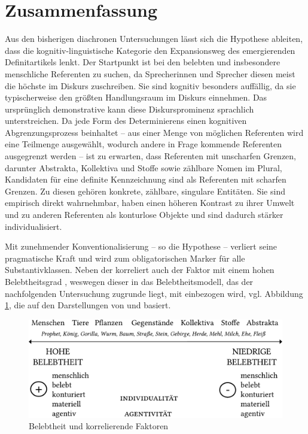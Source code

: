 \section{Zusammenfassung} \label{sec:bel-zusammenfassung}

Aus den bisherigen diachronen Untersuchungen lässt sich die Hypothese ableiten, dass die kognitiv-linguistische Kategorie  den Expansionsweg  des emergierenden Definitartikels  lenkt. Der Startpunkt ist bei den belebten  und insbesondere menschliche Referenten zu suchen, da Sprecherinnen und Sprecher diesen meist die höchste  im Diskurs zuschreiben.
Sie sind kognitiv besonders auffällig, da sie typischerweise den größten Handlungsraum im Diskurs einnehmen. Das ursprünglich demonstrative   kann diese Diskursprominenz sprachlich unterstreichen. Da jede Form des Determinierens einen kognitiven Abgrenzungsprozess beinhaltet -- aus einer Menge von möglichen Referenten wird eine Teilmenge ausgewählt, wodurch andere in Frage kommende Referenten ausgegrenzt werden -- ist zu erwarten, dass Referenten mit unscharfen Grenzen, darunter  Abstrakta, Kollektiva und Stoffe  sowie zählbare Nomen  im Plural,  Kandidaten für eine definite Kennzeichnung sind als Referenten mit scharfen Grenzen. Zu diesen gehören  konkrete, zählbare,  singulare Entitäten. Sie sind empirisch direkt wahrnehmbar, haben einen höheren Kontrast zu ihrer Umwelt und zu anderen Referenten als konturlose Objekte und sind dadurch stärker individualisiert. 

Mit zunehmender Konventionalisierung -- so die Hypothese -- verliert  seine pragmatische Kraft und wird zum obligatorischen Marker für alle  Substantivklassen. Neben der  korreliert auch der Faktor  mit einem hohen Belebtheitsgrad , weswegen dieser in das  Belebtheitsmodell, das der nachfolgenden Untersuchung zugrunde liegt, mit einbezogen wird, vgl. Abbildung \ref{abb:belebtheit-gesamt}, die auf den Darstellungen von \textcite[345]{Szczepaniak2011} und \textcite[98]{Nubling2012} basiert.  
    
\begin{figure}
\includegraphics[width=.75\textwidth]{images/Belebtheitsshierarchie.pdf}
\caption{Belebtheit und korrelierende Faktoren\label{abb:belebtheit-gesamt}}
\end{figure}


